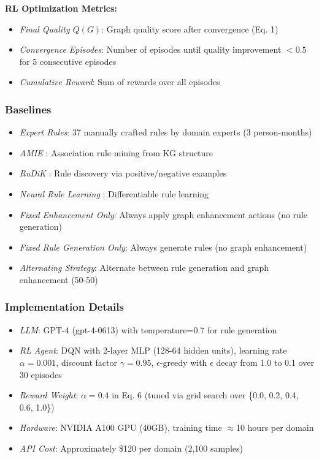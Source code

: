 \documentclass[runningheads]{llncs}
\begin{document}
\textbf{RL Optimization Metrics:}
\begin{itemize}
    \item \textit{Final Quality $Q(G)$}: Graph quality score after convergence (Eq. 1)
    \item \textit{Convergence Episodes}: Number of episodes until quality improvement $< 0.5$ for 5 consecutive episodes
    \item \textit{Cumulative Reward}: Sum of rewards over all episodes
\end{itemize}

\subsubsection{Baselines}
\begin{itemize}
    \item \textit{Expert Rules}: 37 manually crafted rules by domain experts (3 person-months)
    \item \textit{AMIE} \cite{ref_galarraga2013}: Association rule mining from KG structure
    \item \textit{RuDiK} \cite{ref_ortona2018}: Rule discovery via positive/negative examples
    \item \textit{Neural Rule Learning} \cite{ref_yang2017}: Differentiable rule learning
    \item \textit{Fixed Enhancement Only}: Always apply graph enhancement actions (no rule generation)
    \item \textit{Fixed Rule Generation Only}: Always generate rules (no graph enhancement)
    \item \textit{Alternating Strategy}: Alternate between rule generation and graph enhancement (50-50)
\end{itemize}

\subsubsection{Implementation Details}
\begin{itemize}
    \item \textit{LLM}: GPT-4 (gpt-4-0613) with temperature=0.7 for rule generation
    \item \textit{RL Agent}: DQN with 2-layer MLP (128-64 hidden units), learning rate $\alpha=0.001$, discount factor $\gamma=0.95$, $\epsilon$-greedy with $\epsilon$ decay from 1.0 to 0.1 over 30 episodes
    \item \textit{Reward Weight}: $\alpha=0.4$ in Eq. 6 (tuned via grid search over \{0.0, 0.2, 0.4, 0.6, 1.0\})
    \item \textit{Hardware}: NVIDIA A100 GPU (40GB), training time $\approx$10 hours per domain
    \item \textit{API Cost}: Approximately \$120 per domain (2,100 samples)
\end{itemize}
\end{document}
